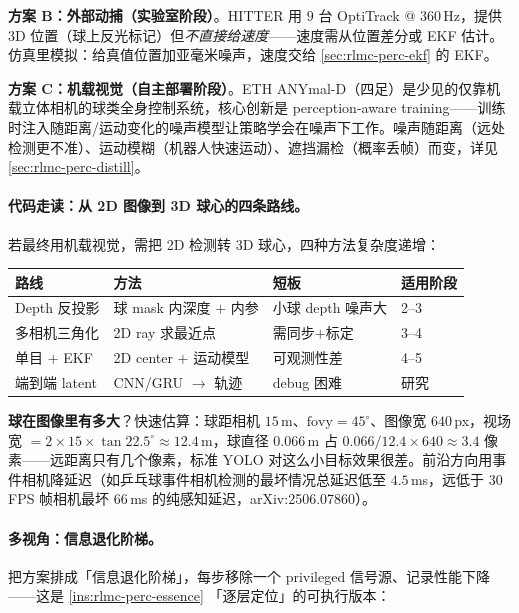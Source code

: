 \textbf{方案 B：外部动捕（实验室阶段）}。HITTER 用 $9$ 台 OptiTrack @ $360$\,Hz\cite{tennis_hitter2025}，提供 3D 位置（球上反光标记）但\emph{不直接给速度}——速度需从位置差分或 EKF 估计。仿真里模拟：给真值位置加亚毫米噪声，速度交给 \cref{sec:rlmc-perc-ekf} 的 EKF。

\textbf{方案 C：机载视觉（自主部署阶段）}。ETH ANYmal-D（四足）是少见的仅靠机载立体相机的球类全身控制系统，核心创新是 perception-aware training——训练时注入随距离/运动变化的噪声模型让策略学会在噪声下工作\cite{tennis_eth2025badminton}。噪声随距离（远处检测更不准）、运动模糊（机器人快速运动）、遮挡漏检（概率丢帧）而变，详见 \cref{sec:rlmc-perc-distill}。

\paragraph{代码走读：从 2D 图像到 3D 球心的四条路线。}若最终用机载视觉，需把 2D 检测转 3D 球心，四种方法复杂度递增：

\begin{center}
\small
\begin{tabular}{@{}llll@{}}
\toprule
路线 & 方法 & 短板 & 适用阶段 \\
\midrule
Depth 反投影 & 球 mask 内深度 $+$ 内参 & 小球 depth 噪声大 & 2--3 \\
多相机三角化 & 2D ray 求最近点 & 需同步$+$标定 & 3--4 \\
单目 $+$ EKF & 2D center $+$ 运动模型 & 可观测性差 & 4--5 \\
端到端 latent & CNN/GRU $\to$ 轨迹 & debug 困难 & 研究 \\
\bottomrule
\end{tabular}
\end{center}

\textbf{球在图像里有多大}？快速估算：球距相机 $15$\,m、$\mathrm{fovy}=45^\circ$、图像宽 $640$\,px，视场宽 $=2\times 15\times\tan 22.5^\circ\approx 12.4$\,m，球直径 $0.066$\,m 占 $0.066/12.4\times 640\approx 3.4$ 像素——远距离只有几个像素，标准 YOLO 对这么小目标效果很差。前沿方向用事件相机降延迟（如乒乓球事件相机检测的最坏情况总延迟低至 $4.5$\,ms，远低于 $30$\,FPS 帧相机最坏 $66$\,ms 的纯感知延迟，arXiv:2506.07860）。

\paragraph{多视角：信息退化阶梯。}把方案排成「信息退化阶梯」，每步移除一个 privileged 信号源、记录性能下降——这是 \cref{ins:rlmc-perc-essence} 「逐层定位」的可执行版本：

